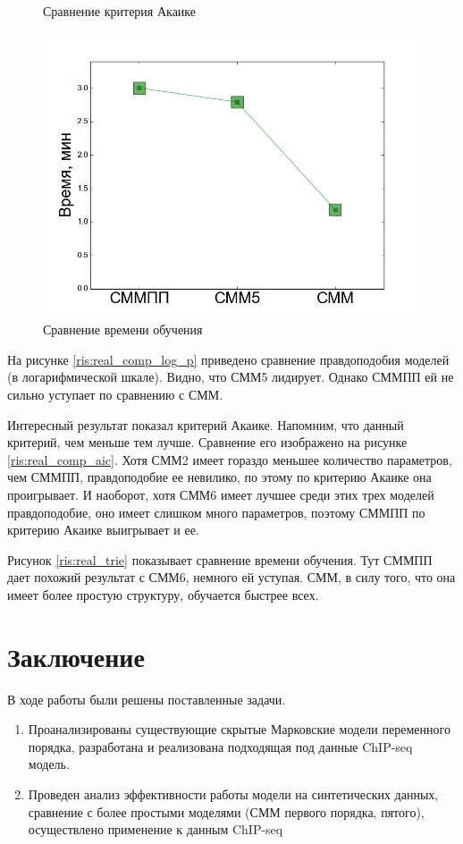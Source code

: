 \documentclass{matmex-diploma-custom}
\begin{document}
\begin{figure}[h!]
\begin{minipage}[b]{0.32 \textwidth}
	\centering
	\caption{ Сравнение критерия Акаике }
	\label{ris:real_comp_aic}
\end{minipage}
\hfill
\begin{minipage}[b]{0.32 \textwidth}
	\includegraphics[scale=0.28]{img/real/time.png}
	\centering
	\caption{ Сравнение времени обучения }
	\label{ris:real_comp_time}
\end{minipage}
\end{figure}

На рисунке \ref{ris:real_comp_log_p} приведено сравнение правдоподобия моделей (в логарифмической шкале). Видно, что СММ5 лидирует. Однако СММПП ей не сильно уступает по сравнению с СММ.

Интересный результат показал критерий Акаике. Напомним, что данный критерий, чем меньше тем лучше. Сравнение его изображено на рисунке \ref{ris:real_comp_aic}.
Хотя СММ2 имеет гораздо меньшее количество параметров, чем СММПП, правдоподобие ее невилико, по этому по критерию Акаике она проигрывает. И наоборот, хотя СММ6 имеет лучшее среди этих трех моделей правдоподобие, оно имеет слишком много параметров, поэтому СММПП по критерию Акаике выигрывает и ее.

Рисунок \ref{ris:real_trie} показывает сравнение времени обучения. Тут СММПП дает похожий результат с СММ6, немного ей уступая. СММ, в силу того, что она имеет более простую структуру, обучается быстрее всех.


\section*{Заключение}
В ходе работы были решены поставленные задачи.
\begin{enumerate}
\item
Проанализированы существующие скрытые Марковские
модели переменного порядка, разработана и
реализована подходящая под данные ChIP-seq модель.
\item
Проведен анализ эффективности работы модели на
синтетических данных, сравнение с более простыми
моделями (СММ первого порядка, пятого), осуществлено применение к
данным ChIP-seq
\end{enumerate}




\end{document}

